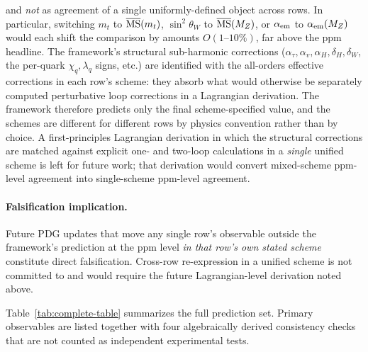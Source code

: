 ﻿\documentclass[reprint,amsmath,amssymb,aps,prd,longbibliography,floatfix]{revtex4-2}
\begin{document}
and \emph{not} as agreement of a single uniformly-defined object
across rows. In particular, switching $m_t$ to
$\overline{\rm MS}(m_t)$, $\sin^2\theta_W$ to
$\overline{\rm MS}(M_Z)$, or $\alpha_{\rm em}$ to
$\alpha_{\rm em}(M_Z)$ would each shift the comparison by amounts
$O(1\text{--}10\%)$, far above the ppm headline. The framework's
structural sub-harmonic corrections ($\alpha_\tau, \alpha_v,
\alpha_H, \delta_H, \delta_W$, the per-quark
$\chi_q, \lambda_q$ signs, etc.) are identified with the all-orders
effective corrections in each row's scheme: they absorb what would
otherwise be separately computed perturbative loop corrections in
a Lagrangian derivation. The framework therefore predicts only the
final scheme-specified value, and the schemes are different for
different rows by physics convention rather than by choice.
A first-principles
Lagrangian derivation in which the structural corrections are
matched against explicit one- and two-loop calculations in a
\emph{single} unified scheme is left for future work; that
derivation would convert mixed-scheme ppm-level agreement into
single-scheme ppm-level agreement.

\paragraph{Falsification implication.}
Future PDG updates that move any single row's observable outside
the framework's prediction at the ppm level \emph{in that row's
own stated scheme} constitute direct falsification. Cross-row
re-expression in a unified scheme is not committed to and would
require the future Lagrangian-level derivation noted above.

Table~\ref{tab:complete-table} summarizes the full prediction set. Primary
observables are listed together with four algebraically derived
consistency checks that are not counted as independent experimental
tests.








\end{document}
